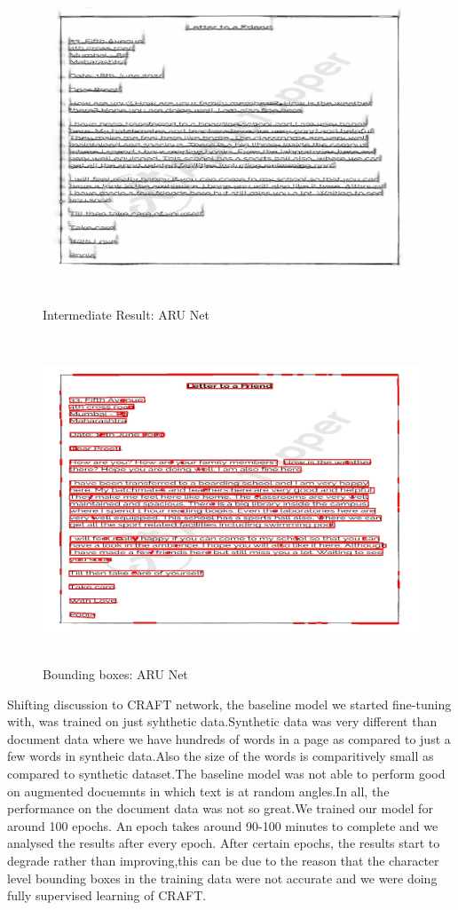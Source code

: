 \begin{figure}[H]
	\includegraphics[width=475pt,height=275pt]{res.jpg}
	\caption{Intermediate Result: ARU Net}
\end{figure}


\begin{figure}[H]
	\includegraphics[width=475pt,height=275pt]{res_boxes.jpg}
	\caption{Bounding boxes: ARU Net}
\end{figure}

Shifting discussion to CRAFT network, the baseline model we started fine-tuning with, was trained on just syhthetic data.Synthetic data was very different than document data where we have hundreds of words in a page as compared to just a few words in syntheic data.Also the size of the words is comparitively small as compared to synthetic dataset.The baseline model was not able to perform good on augmented docuemnts in which text is at random angles.In all, the performance on the document data was not so great.We trained our model for around 100 epochs. An epoch takes around 90-100 minutes to complete and we analysed the results after every epoch. After certain epochs, the results start to degrade rather than improving,this can be due to the reason that the character level bounding boxes in the training data were not accurate and we were doing fully supervised learning of CRAFT.

